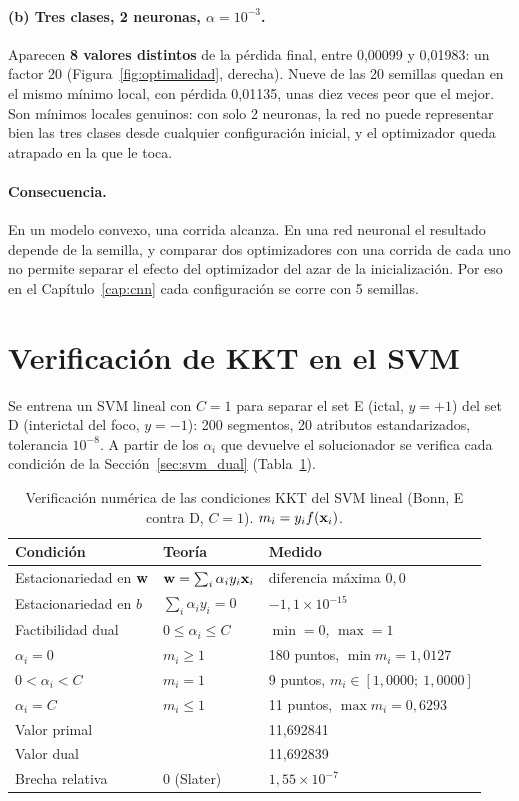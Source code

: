 \paragraph{(b) Tres clases, 2 neuronas, $\alpha = 10^{-3}$.} Aparecen \textbf{8 valores distintos} de la pérdida final, entre
0,00099 y 0,01983: un factor 20 (Figura~\ref{fig:optimalidad}, derecha). Nueve de las 20 semillas quedan en el mismo
mínimo local, con pérdida 0,01135, unas diez veces peor que el mejor. Son mínimos locales genuinos: con solo 2
neuronas, la red no puede representar bien las tres clases desde cualquier configuración inicial, y el optimizador
queda atrapado en la que le toca.

\paragraph{Consecuencia.} En un modelo convexo, una corrida alcanza. En una red neuronal el resultado depende de la
semilla, y comparar dos optimizadores con una corrida de cada uno no permite separar el efecto del optimizador del
azar de la inicialización. Por eso en el Capítulo~\ref{cap:cnn} cada configuración se corre con 5 semillas.

\section{Verificación de KKT en el SVM}
\label{sec:verif_kkt}

Se entrena un SVM lineal con $C = 1$ para separar el set E (ictal, $y = +1$) del set D (interictal del foco, $y = -1$):
200 segmentos, 20 atributos estandarizados, tolerancia $10^{-8}$. A partir de los $\alpha_i$ que devuelve el
solucionador se verifica cada condición de la Sección~\ref{sec:svm_dual} (Tabla~\ref{tab:kkt_verif}).

\begin{table}[ht]
\centering
\caption{Verificación numérica de las condiciones KKT del SVM lineal (Bonn, E contra D, $C = 1$). $m_i = y_i f(\mathbf{x}_i)$.}
\label{tab:kkt_verif}
\begin{tabular}{lll}
\toprule
Condición & Teoría & Medido \\
\midrule
Estacionariedad en $\mathbf{w}$ & $\mathbf{w} = \sum_i\alpha_i y_i\mathbf{x}_i$ & diferencia máxima $0{,}0$ \\
Estacionariedad en $b$ & $\sum_i\alpha_i y_i = 0$ & $-1{,}1\times10^{-15}$ \\
Factibilidad dual & $0 \le \alpha_i \le C$ & $\min = 0$, $\max = 1$ \\
$\alpha_i = 0$ & $m_i \ge 1$ & 180 puntos, $\min m_i = 1{,}0127$ \\
$0 < \alpha_i < C$ & $m_i = 1$ & 9 puntos, $m_i \in [1{,}0000;\ 1{,}0000]$ \\
$\alpha_i = C$ & $m_i \le 1$ & 11 puntos, $\max m_i = 0{,}6293$ \\
Valor primal & & 11,692841 \\
Valor dual & & 11,692839 \\
Brecha relativa & $0$ (Slater) & $1{,}55\times10^{-7}$ \\
\bottomrule
\end{tabular}
\end{table}

